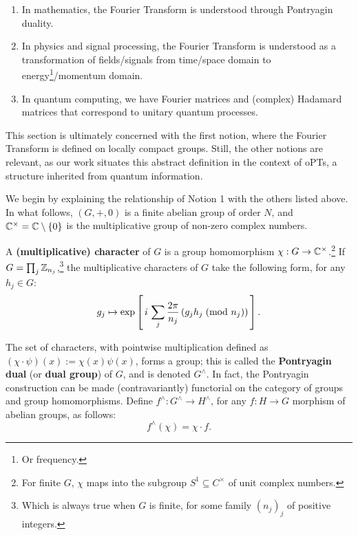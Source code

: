 \begin{enumerate}
  \item[1.] In mathematics, the Fourier Transform is understood through Pontryagin duality.
  \item[2.] In physics and signal processing, the Fourier Transform is understood as a transformation of fields/signals from time/space domain to energy\footnote{Or frequency.}/momentum domain.
  \item[3.] In quantum computing, we have Fourier matrices and (complex) Hadamard matrices that correspond to unitary quantum processes.
\end{enumerate}

This section is ultimately concerned with the first notion, where the Fourier Transform is defined on locally compact groups. Still, the other notions are relevant, as our work situates this abstract definition in the context of oPTs, a structure inherited from quantum information. 

We begin by explaining the relationship of Notion 1 with the others listed above. In what follows, $(G,+,0)$ is a finite abelian group of order $N$, and $\mathbb{C}^{\times}=\mathbb{C}\setminus\{0\}$ is the multiplicative group of non-zero complex numbers.

A \textbf{(multiplicative) character} of $G$ is a group homomorphism $\chi:G\to \mathbb{C}^\times$.\footnote{For finite $G$, $\chi$ maps into the subgroup $S^1 \subseteq C^\times$ of unit complex numbers.} If $G = \prod_j \mathbb{Z}_{n_j}$,\footnote{Which is always true when $G$ is finite, for some family $(n_j)_j$ of positive integers.} the multiplicative characters of $G$ take the following form, for any $h_j \in G$:
\begin{equation}
\label{eqn:FTDefCharacters}
  g_j \mapsto \exp\left[\, i \, \sum_j \frac{2 \pi}{n_j} \left(g_jh_j \; (\text{mod } n_j)\right) \, \right].
\end{equation}

The set of characters, with pointwise multiplication defined as $(\chi\cdot\psi)(x):=\chi(x)\psi(x)$, forms a group; this is called the \textbf{Pontryagin dual} (or \textbf{dual group}) of $G$, and is denoted $G^\wedge$. In fact, the Pontryagin construction can be made (contravariantly) functorial on the category  of groups and group homomorphisms. Define $f^\wedge : G^\wedge \rightarrow H^\wedge$, for any $f: H \rightarrow G$ morphism of abelian groups, as follows:
\begin{equation*}
  f^\wedge( \chi ) = \chi \cdot f.
\end{equation*}

